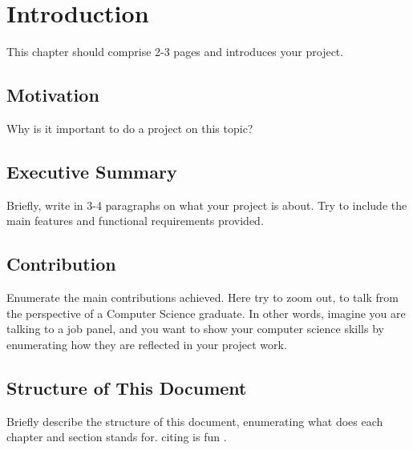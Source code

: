\chapter{Introduction}
This chapter should comprise 2-3 pages and introduces your project.

\section{Motivation}
Why is it important to do a project on this topic? 

\section{Executive Summary}
Briefly, write in 3-4 paragraphs on what your project is about.
Try to include the main features and functional requirements provided. 
\cite{Reference1}
\cite{Reference3}

\section{Contribution}
Enumerate the main contributions achieved. Here try to zoom out, to talk from the perspective of a Computer Science graduate. In other words, imagine you are talking to a job panel, and you want to show your computer science skills by enumerating how they are reflected in your project work.

\section{Structure of This Document}
Briefly describe the structure of this document, enumerating what does each chapter and section stands for. citing is fun \cite{Reference1}.